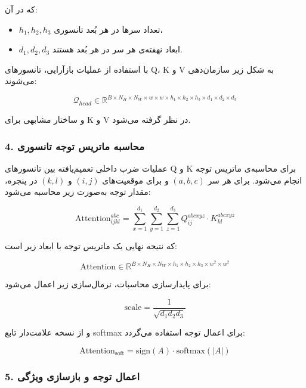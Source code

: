 که در آن:
\begin{itemize}
	\item $h_1, h_2, h_3$ تعداد سرها در هر بُعد تانسوری،
	\item $d_1, d_2, d_3$ ابعاد نهفته‌ی هر سر در هر بُعد هستند.
\end{itemize}

با استفاده از عملیات بازآرایی، تانسورهای Q، K و V به شکل زیر سازمان‌دهی می‌شوند:

\[
\mathcal{Q}_{head} \in \mathbb{R}^{B \times N_H \times N_W \times w \times w \times h_1 \times h_2 \times h_3 \times d_1 \times d_2 \times d_3}
\]

و ساختار مشابهی برای K و V در نظر گرفته می‌شود.

\subsubsection*{4. محاسبه ماتریس توجه تانسوری}

عملیات ضرب داخلی تعمیم‌یافته بین تانسورهای Q و K برای محاسبه‌ی ماتریس توجه انجام می‌شود. برای هر سر $(a,b,c)$ و برای موقعیت‌های $(i,j)$ و $(k,l)$ در پنجره، مقدار توجه به‌صورت زیر محاسبه می‌شود:

\begin{equation}
	\text{Attention}_{ijkl}^{abc} = \sum_{x=1}^{d_1} \sum_{y=1}^{d_2} \sum_{z=1}^{d_3} 
	Q_{ij}^{abcxyz} \cdot K_{kl}^{abcxyz}
\end{equation}


که نتیجه نهایی یک ماتریس توجه با ابعاد زیر است:

\[
\text{Attention} \in \mathbb{R}^{B \times N_H \times N_W \times h_1 \times h_2 \times h_3 \times w^2 \times w^2}
\]

برای پایدارسازی محاسبات، نرمال‌سازی زیر اعمال می‌شود:

\begin{equation}
	\text{scale} = \frac{1}{\sqrt{d_1 d_2 d_3}}
\end{equation}


و از نسخه علامت‌دار تابع softmax برای اعمال توجه استفاده می‌گردد:

\begin{equation}
	\text{Attention}_{\text{soft}} = \text{sign}(A) \cdot \text{softmax}(|A|)
\end{equation}


\subsubsection*{5. اعمال توجه و بازسازی ویژگی}


